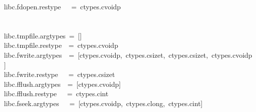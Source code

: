 \documentclass{article}\usepackage[]{graphicx}\usepackage[dvipsnames,table]{xcolor}
\makeatletter
\newcommand{\hlopt}[1]{\textcolor[rgb]{0,0,0}{#1}}%
\newcommand{\hldef}[1]{\textcolor[rgb]{0.345,0.345,0.345}{#1}}%
\newenvironment{kframe}{%
 \def\at@end@of@kframe{}%
 \ifinner\ifhmode%
  \def\at@end@of@kframe{\end{minipage}}%
  \begin{minipage}{\columnwidth}%
 \fi\fi%
 \def\FrameCommand##1{\hskip\@totalleftmargin \hskip-\fboxsep
 \colorbox{shadecolor}{##1}\hskip-\fboxsep
     \hskip-\linewidth \hskip-\@totalleftmargin \hskip\columnwidth}%
 \MakeFramed {\advance\hsize-\width
   \@totalleftmargin\z@ \linewidth\hsize
   \@setminipage}}%
 {\par\unskip\endMakeFramed%
 \at@end@of@kframe}
\newenvironment{knitrout}{}{} %
\makeatother
\begin{document}
\begin{center}
\begin{minipage}[m]{15cm}
\begin{knitrout}
\begin{kframe}
\hldef{\textunderscore libc}\hlopt{.}\hldef{fdopen}\hlopt{.}\hldef{restype}\hldef{\ \ \ }\hldef{}\hlopt{=\ }\hldef{ctypes}\hlopt{.}\hldef{c\textunderscore void\textunderscore p}\hspace*{\fill}\\
\hldef{}\hspace*{\fill}\\
\hldef{}\hspace*{\fill}\\
\hldef{\textunderscore libc}\hlopt{.}\hldef{tmpfile}\hlopt{.}\hldef{argtypes\ }\hlopt{=\ {[}{]}}\hspace*{\fill}\\
\hldef{\textunderscore libc}\hlopt{.}\hldef{tmpfile}\hlopt{.}\hldef{restype}\hldef{\ \ }\hldef{}\hlopt{=\ }\hldef{ctypes}\hlopt{.}\hldef{c\textunderscore void\textunderscore p}\hspace*{\fill}\\
\hldef{\textunderscore libc}\hlopt{.}\hldef{fwrite}\hlopt{.}\hldef{argtypes}\hldef{\ \ }\hldef{}\hlopt{=\ {[}}\hldef{ctypes}\hlopt{.}\hldef{c\textunderscore void\textunderscore p}\hlopt{,\ }\hldef{ctypes}\hlopt{.}\hldef{c\textunderscore size\textunderscore t}\hlopt{,\ }\hldef{ctypes}\hlopt{.}\hldef{c\textunderscore size\textunderscore t}\hlopt{,\ }\hldef{ctypes}\hlopt{.}\hldef{c\textunderscore void\textunderscore p}\hlopt{{]}}\hspace*{\fill}\\
\hldef{\textunderscore libc}\hlopt{.}\hldef{fwrite}\hlopt{.}\hldef{restype}\hldef{\ \ \ }\hldef{}\hlopt{=\ }\hldef{ctypes}\hlopt{.}\hldef{c\textunderscore size\textunderscore t}\hspace*{\fill}\\
\hldef{\textunderscore libc}\hlopt{.}\hldef{fflush}\hlopt{.}\hldef{argtypes}\hldef{\ \ }\hldef{}\hlopt{=\ {[}}\hldef{ctypes}\hlopt{.}\hldef{c\textunderscore void\textunderscore p}\hlopt{{]}}\hspace*{\fill}\\
\hldef{\textunderscore libc}\hlopt{.}\hldef{fflush}\hlopt{.}\hldef{restype}\hldef{\ \ \ }\hldef{}\hlopt{=\ }\hldef{ctypes}\hlopt{.}\hldef{c\textunderscore int}\hspace*{\fill}\\
\hldef{\textunderscore libc}\hlopt{.}\hldef{fseek}\hlopt{.}\hldef{argtypes}\hldef{\ \ \ }\hldef{}\hlopt{=\ {[}}\hldef{ctypes}\hlopt{.}\hldef{c\textunderscore void\textunderscore p}\hlopt{,\ }\hldef{ctypes}\hlopt{.}\hldef{c\textunderscore long}\hlopt{,\ }\hldef{ctypes}\hlopt{.}\hldef{c\textunderscore int}\hlopt{{]}}\hspace*{\fill}\\

\end{kframe}
\end{knitrout}
\end{minipage}
\end{center}
\end{document}
